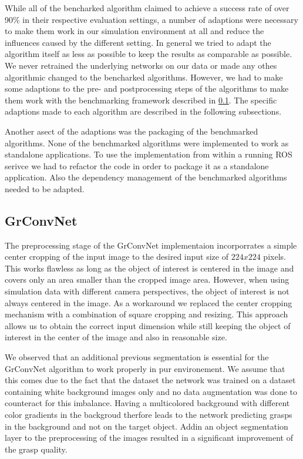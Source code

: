 While all of the bencharked algorithm claimed to achieve a success rate of over 90\% in their respective evaluation settings, a number of adaptions were necessary to
make them work in our simulation environment at all and reduce the influences caused by the different setting.
In general we tried to adapt the algorithm itself as less as possible to keep the results as comparable as possible.
We never retrained the underlying networks on our data or made any othes algorithmic changed to the bencharked algorithms.
However, we had to make some adaptions to the pre- and postprocessing steps of the algorithms to make them work with the benchmarking framework described in \ref{}.
The specific adaptions made to each algorithm are described in the following subsections.

Another asect of the adaptions was the packaging of the benchmarked algorithms.
None of the benchmarked algorithms were implemented to work as standalone applications.
To use the implementation from within a running ROS serivce we had to refactor the code in order to package it as a standalone application.
Also the dependency management of the benchmarked algorithms needed to be adapted.


\subsection{GrConvNet}

The preprocessing stage of the GrConvNet implementaion incorporrates a simple center cropping of the input image to the desired input size of $224x224$ pixels.
This works flawless as long as the object of interest is centered in the image and covers only an area smaller than the cropped image area.
However, when using simulation data with different camera perspectives, the object of interest is not always centered in the image.
As a workaround we replaced the center cropping mechanism with a combination of square cropping and resizing.
This approach allows us to obtain the correct input dimension while still keeping the object of interest in the center of the image and also in reasonable size.

We observed that an additional previous segmentation is essential for the GrConvNet algorithm to work properly in pur environement.
We assume that this comes due to the fact that the dataset the network was trained on a dataset containing white background images only and no data augmentation
was done to counteract for this imbalance.
Having a multicolored background with different color gradients in the backgroud therfore leads to the network predicting grasps in the background and not on the target object.
Addin an object segmentation layer to the preprocessing of the images resulted in a significant improvement of the grasp quality.

